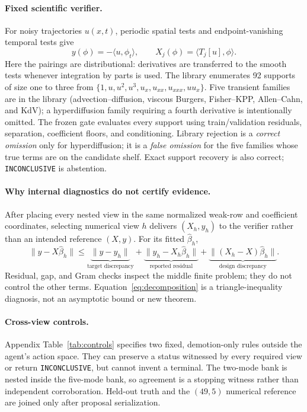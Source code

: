 \documentclass{article}
\newcommand{\INC}{\texttt{INCONCLUSIVE}\xspace}
\begin{document}
\paragraph{Fixed scientific verifier.}
For noisy trajectories $u(x,t)$, periodic spatial tests and endpoint-vanishing temporal tests give
\begin{equation}
 y(\phi)=-\langle u,\phi_t\rangle,\qquad
 X_j(\phi)=\langle T_j[u],\phi\rangle .
 \label{eq:weak}
\end{equation}
Here the pairings are distributional: derivatives are transferred to the smooth tests whenever
integration by parts is used. The library enumerates 92 supports of size one to three from
$\{1,u,u^2,u^3,u_x,u_{xx},u_{xxx},uu_x\}$. Five transient families are in the library
(advection--diffusion, viscous Burgers, Fisher--KPP, Allen--Cahn, and KdV); a hyperdiffusion family
requiring a fourth derivative is intentionally omitted. The frozen gate evaluates every support using
train/validation residuals, separation, coefficient floors, and conditioning. Library rejection is a
\emph{correct omission} only for hyperdiffusion; it is a \emph{false omission} for the five families
whose true terms are on the candidate shelf. Exact support recovery is also correct; \INC is abstention.

\paragraph{Why internal diagnostics do not certify evidence.}
After placing every nested view in the same normalized weak-row and coefficient coordinates, selecting
numerical view $h$ delivers $(X_h,y_h)$ to the verifier rather than an intended reference $(X,y)$.
For its fitted $\hat\beta_h$,
\begin{equation}
 \|y-X\hat\beta_h\|\le
 \underbrace{\|y-y_h\|}_{\text{target discrepancy}}+
 \underbrace{\|y_h-X_h\hat\beta_h\|}_{\text{reported residual}}+
 \underbrace{\|(X_h-X)\hat\beta_h\|}_{\text{design discrepancy}}.
 \label{eq:decomposition}
\end{equation}
Residual, gap, and Gram checks inspect the middle finite problem; they do not control the other
terms. Equation~\eqref{eq:decomposition} is a triangle-inequality diagnosis, not an asymptotic
bound or new theorem.

\paragraph{Cross-view controls.}
Appendix Table~\ref{tab:controls} specifies two fixed, demotion-only rules outside the agent's action
space. They can preserve a
status witnessed by every required view or return \INC, but cannot invent a terminal. The
two-mode bank is nested inside the five-mode bank, so agreement is a stopping witness rather than
independent corroboration. Held-out truth and the $(49,5)$ numerical reference are joined only
after proposal serialization.
\end{document}
